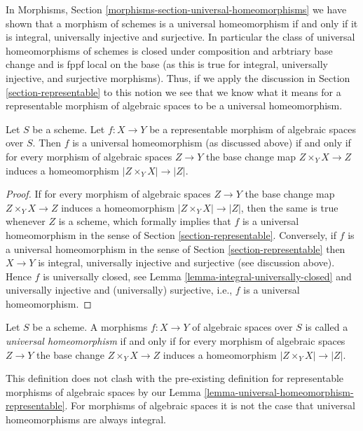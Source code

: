 \noindent
In
Morphisms, Section \ref{morphisms-section-universal-homeomorphisms}
we have shown that a morphism of schemes is a universal homeomorphism
if and only if it is integral, universally injective and surjective.
In particular the class of universal homeomorphisms of schemes
is closed under composition and arbtriary base change and is fppf local
on the base (as this is true for integral, universally injective, and
surjective morphisms). Thus, if we apply the discussion in
Section \ref{section-representable}
to this notion we see that we know what it means for a representable
morphism of algebraic spaces to be a universal homeomorphism.

\begin{lemma}
\label{lemma-universal-homeomorphism-representable}
Let $S$ be a scheme.
Let $f : X \to Y$ be a representable morphism of algebraic spaces over $S$.
Then $f$ is a universal homeomorphism (as discussed above) if and only
if for every morphism of algebraic spaces $Z \to Y$ the base change
map $Z \times_Y X \to Z$ induces a homeomorphism
$|Z \times_Y X| \to |Z|$.
\end{lemma}

\begin{proof}
If for every morphism of algebraic spaces $Z \to Y$ the base change
map $Z \times_Y X \to Z$ induces a homeomorphism
$|Z \times_Y X| \to |Z|$, then the same is true whenever $Z$ is a scheme,
which formally implies that $f$ is a universal homeomorphism in the
sense of
Section \ref{section-representable}.
Conversely, if $f$ is a universal homeomorphism in the sense of
Section \ref{section-representable}
then $X \to Y$ is integral, universally injective and surjective
(see discussion above). Hence $f$ is universally closed, see
Lemma \ref{lemma-integral-universally-closed}
and universally injective and (universally) surjective, i.e.,
$f$ is a universal homeomorphism.
\end{proof}

\begin{definition}
\label{definition-universal-homeomorphism}
Let $S$ be a scheme.
A morphisms $f : X \to Y$ of algebraic spaces over $S$
is called a {\it universal homeomorphism}
if and only if for every morphism of algebraic spaces $Z \to Y$
the base change $Z \times_Y X \to Z$ induces a homeomorphism
$|Z \times_Y X| \to |Z|$.
\end{definition}

\noindent
This definition does not clash with the pre-existing definition for
representable morphisms of algebraic spaces by our
Lemma \ref{lemma-universal-homeomorphism-representable}.
For morphisms of algebraic spaces it is not the case that universal
homeomorphisms are always integral.

